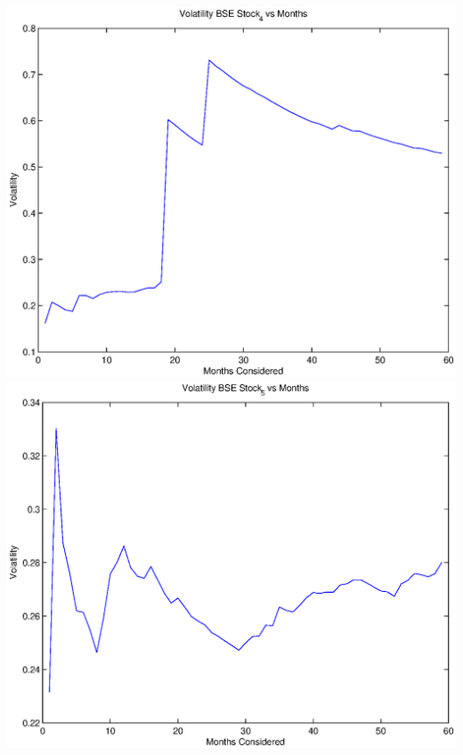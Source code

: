 \documentclass{article}
\begin{document}
\includegraphics[width=\textwidth]{Volatility_BSE_Stock_4_vs_Months} \\

\includegraphics[width=\textwidth]{Volatility_BSE_Stock_5_vs_Months} \\
\end{document}
